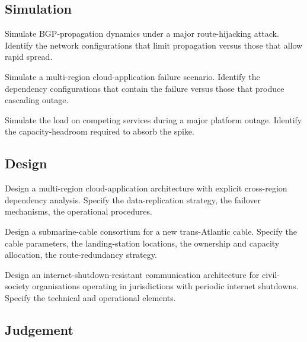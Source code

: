 \subsection*{Simulation}

\begin{exercise}
Simulate BGP-propagation dynamics under a major route-hijacking attack. Identify the network configurations that limit propagation versus those that allow rapid spread.
\end{exercise}

\begin{exercise}
Simulate a multi-region cloud-application failure scenario. Identify the dependency configurations that contain the failure versus those that produce cascading outage.
\end{exercise}

\begin{exercise}
Simulate the load on competing services during a major platform outage. Identify the capacity-headroom required to absorb the spike.
\end{exercise}

\subsection*{Design}

\begin{exercise}
Design a multi-region cloud-application architecture with explicit cross-region dependency analysis. Specify the data-replication strategy, the failover mechanisms, the operational procedures.
\end{exercise}

\begin{exercise}
Design a submarine-cable consortium for a new trans-Atlantic cable. Specify the cable parameters, the landing-station locations, the ownership and capacity allocation, the route-redundancy strategy.
\end{exercise}

\begin{exercise}
Design an internet-shutdown-resistant communication architecture for civil-society organisations operating in jurisdictions with periodic internet shutdowns. Specify the technical and operational elements.
\end{exercise}

\subsection*{Judgement}

